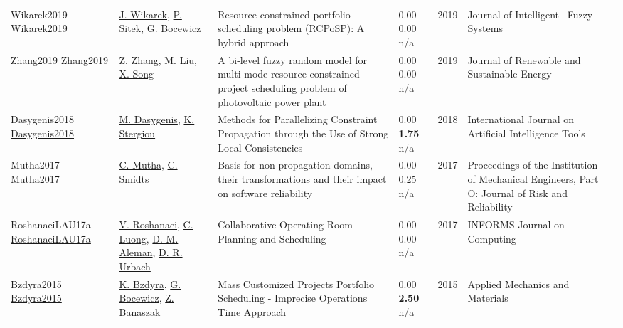 {\begin{longtable}{p{3cm}p{5cm}p{10cm}p{1cm}rp{2.5cm}l}
Wikarek2019 \href{http://dx.doi.org/10.3233/jifs-179364}{Wikarek2019} & \hyperref[auth:a534]{J. Wikarek}, \hyperref[auth:a1474]{P. Sitek}, \hyperref[auth:a629]{G. Bocewicz} & Resource constrained portfolio scheduling problem (RCPoSP): A hybrid approach & \noindent{}\textcolor{black!50}{0.00} \textcolor{black!50}{0.00} n/a & 2019 & Journal of Intelligent \  Fuzzy Systems & \cite{Wikarek2019}\\
Zhang2019 \href{http://dx.doi.org/10.1063/1.5053623}{Zhang2019} & \hyperref[auth:a1742]{Z. Zhang}, \hyperref[auth:a1743]{M. Liu}, \hyperref[auth:a1744]{X. Song} & A bi-level fuzzy random model for multi-mode resource-constrained project scheduling problem of photovoltaic power plant & \noindent{}\textcolor{black!50}{0.00} \textcolor{black!50}{0.00} n/a & 2019 & Journal of Renewable and Sustainable Energy & \cite{Zhang2019}\\
Dasygenis2018 \href{http://dx.doi.org/10.1142/s0218213018600023}{Dasygenis2018} & \hyperref[auth:a1997]{M. Dasygenis}, \hyperref[auth:a1998]{K. Stergiou} & Methods for Parallelizing Constraint Propagation through the Use of Strong Local Consistencies & \noindent{}\textcolor{black!50}{0.00} \textbf{1.75} n/a & 2018 & International Journal on Artificial Intelligence Tools & \cite{Dasygenis2018}\\
Mutha2017 \href{http://dx.doi.org/10.1177/1748006x17744380}{Mutha2017} & \hyperref[auth:a1954]{C. Mutha}, \hyperref[auth:a1955]{C. Smidts} & Basis for non-propagation domains, their transformations and their impact on software reliability & \noindent{}\textcolor{black!50}{0.00} 0.25 n/a & 2017 & Proceedings of the Institution of Mechanical Engineers, Part O: Journal of Risk and Reliability & \cite{Mutha2017}\\
RoshanaeiLAU17a \href{http://dx.doi.org/10.1287/ijoc.2017.0745}{RoshanaeiLAU17a} & \hyperref[auth:a727]{V. Roshanaei}, \hyperref[auth:a926]{C. Luong}, \hyperref[auth:a894]{D. M. Aleman}, \hyperref[auth:a895]{D. R. Urbach} & Collaborative Operating Room Planning and Scheduling & \noindent{}\textcolor{black!50}{0.00} \textcolor{black!50}{0.00} n/a & 2017 & \cellcolor{red!20}INFORMS Journal on Computing & \cite{RoshanaeiLAU17a}\\
Bzdyra2015 \href{http://dx.doi.org/10.4028/www.scientific.net/amm.791.70}{Bzdyra2015} & \hyperref[auth:a1810]{K. Bzdyra}, \hyperref[auth:a629]{G. Bocewicz}, \hyperref[auth:a1811]{Z. Banaszak} & Mass Customized Projects Portfolio Scheduling - Imprecise Operations Time Approach & \noindent{}\textcolor{black!50}{0.00} \textbf{2.50} n/a & 2015 & Applied Mechanics and Materials & \cite{Bzdyra2015}\\

\end{longtable}}
